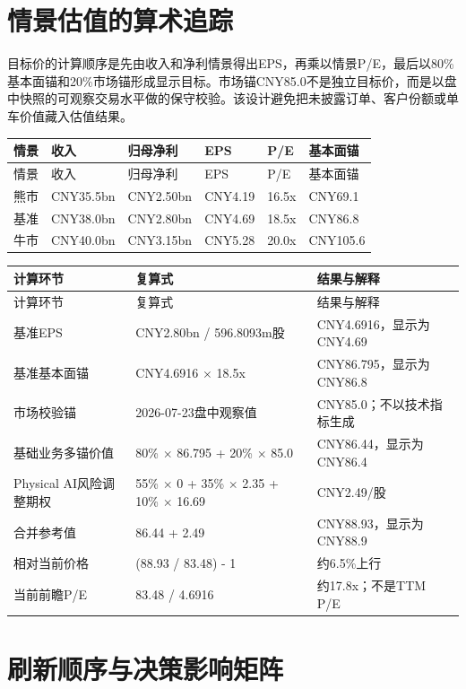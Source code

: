 \section{情景估值的算术追踪}

目标价的计算顺序是先由收入和净利情景得出EPS，再乘以情景P/E，最后以80\%基本面锚和20\%市场锚形成显示目标。市场锚CNY85.0不是独立目标价，而是以盘中快照的可观察交易水平做的保守校验。该设计避免把未披露订单、客户份额或单车价值藏入估值结果。

\begin{longtable}{L{2.1cm}L{2.0cm}L{1.7cm}L{1.5cm}L{1.9cm}L{2.4cm}}
\toprule
情景 & 收入 & 归母净利 & EPS & P/E & 基本面锚 \\
\midrule
\endfirsthead
\toprule
情景 & 收入 & 归母净利 & EPS & P/E & 基本面锚 \\
\midrule
\endhead
熊市 & CNY35.5bn & CNY2.50bn & CNY4.19 & 16.5x & CNY69.1 \\
基准 & CNY38.0bn & CNY2.80bn & CNY4.69 & 18.5x & CNY86.8 \\
牛市 & CNY40.0bn & CNY3.15bn & CNY5.28 & 20.0x & CNY105.6 \\
\bottomrule
\end{longtable}

\begin{longtable}{L{3.4cm}L{3.1cm}L{4.1cm}}
\toprule
计算环节 & 复算式 & 结果与解释 \\
\midrule
\endfirsthead
\toprule
计算环节 & 复算式 & 结果与解释 \\
\midrule
\endhead
基准EPS & CNY2.80bn / 596.8093m股 & CNY4.6916，显示为CNY4.69 \\
基准基本面锚 & CNY4.6916 $\times$ 18.5x & CNY86.795，显示为CNY86.8 \\
市场校验锚 & 2026-07-23盘中观察值 & CNY85.0；不以技术指标生成 \\
基础业务多锚价值 & 80\% $\times$ 86.795 + 20\% $\times$ 85.0 & CNY86.44，显示为CNY86.4 \\
Physical AI风险调整期权 & 55\% $\times$ 0 + 35\% $\times$ 2.35 + 10\% $\times$ 16.69 & CNY2.49/股 \\
合并参考值 & 86.44 + 2.49 & CNY88.93，显示为CNY88.9 \\
相对当前价格 & (88.93 / 83.48) - 1 & 约6.5\%上行 \\
当前前瞻P/E & 83.48 / 4.6916 & 约17.8x；不是TTM P/E \\
\bottomrule
\end{longtable}

\section{刷新顺序与决策影响矩阵}


